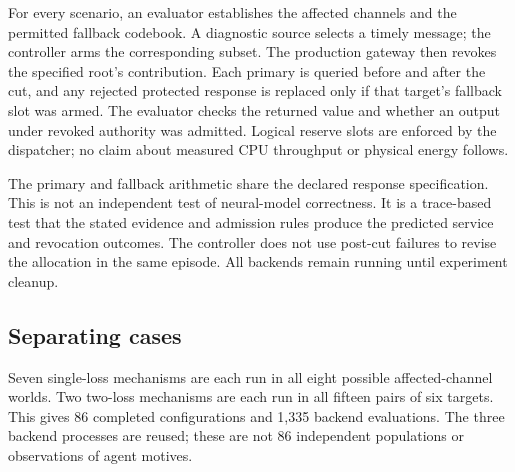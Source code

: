 \documentclass[11pt,a4paper]{article}
\theoremstyle{definition}\newtheorem{definition}{Definition}
\begin{document}
For every scenario, an evaluator establishes the affected channels and the permitted fallback codebook. A diagnostic source selects a timely message; the controller arms the corresponding subset. The production gateway then revokes the specified root's contribution. Each primary is queried before and after the cut, and any rejected protected response is replaced only if that target's fallback slot was armed. The evaluator checks the returned value and whether an output under revoked authority was admitted. Logical reserve slots are enforced by the dispatcher; no claim about measured CPU throughput or physical energy follows.

The primary and fallback arithmetic share the declared response specification. This is not an independent test of neural-model correctness. It is a trace-based test that the stated evidence and admission rules produce the predicted service and revocation outcomes. The controller does not use post-cut failures to revise the allocation in the same episode. All backends remain running until experiment cleanup.

\subsection{Separating cases}
Seven single-loss mechanisms are each run in all eight possible affected-channel worlds. Two two-loss mechanisms are each run in all fifteen pairs of six targets. This gives 86 completed configurations and 1,335 backend evaluations. The three backend processes are reused; these are not 86 independent populations or observations of agent motives.
\end{document}
